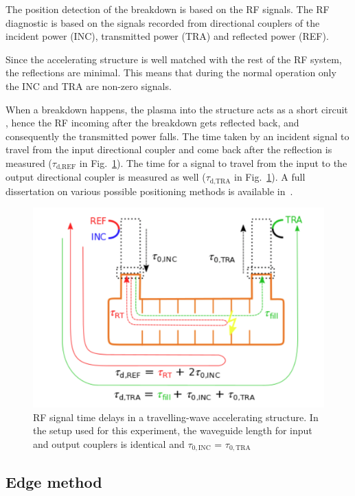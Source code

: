 The position detection of the breakdown is based on the RF signals. The RF diagnostic is based on the signals recorded from directional couplers of the incident power (INC), transmitted power (TRA) and reflected power (REF). 

Since the accelerating structure is well matched with the rest of the RF system, the reflections are minimal. This means that during the normal operation only the INC and TRA are non-zero signals.

When a breakdown happens, the plasma into the structure acts as a short circuit \cite{Degiovanni:2025952}, hence the RF incoming after the breakdown gets reflected back, and consequently the transmitted power falls. The time taken by an incident signal to travel from the input directional coupler and come back after the reflection is measured ($\tau_\text{d,REF}$  in Fig.~\ref{BD_scheme}). The time for a signal to travel from the input to the output directional coupler is measured as well ($\tau_\text{d,TRA}$ in Fig.~\ref{BD_scheme}).  A full dissertation on various possible positioning methods is available in~\cite{Rajamaki:2143815}.

\begin{figure}[h]
\centering 
\includegraphics[scale=0.3]{pictures/structure_scheme}
\caption{RF signal time delays in a travelling-wave accelerating structure. In the setup used for this experiment, the waveguide length for input and output couplers is identical and $\tau_{0,\text{INC}}$ = $\tau_{0,\text{TRA}}$}
\label{BD_scheme}
\end{figure}


\subsection[Edge method]{Edge method}

